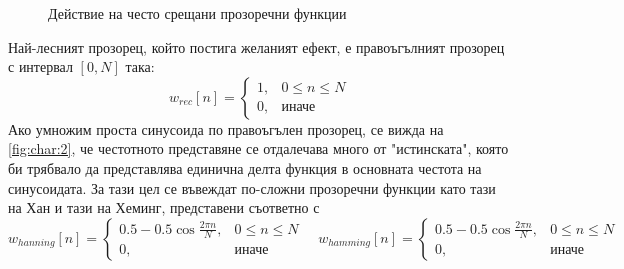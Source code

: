 \documentclass[main.tex]{subfiles}
\begin{document}
    \begin{figure}[H]%
        \centering
            \hspace{2cm}
            \vfill
            \hspace{2cm}
            \vfill
            \hspace{2cm}
        \caption{Действие на често срещани прозоречни функции}%
        \label{fig:char:2}
    \end{figure}

    Най-лесният прозорец, който постига желаният ефект, е правоъгълният прозорец с интервал $[0, N]$ така: 
   \[
    w_{rec}[n] = \begin{cases} 
        1, & 0\leq n \leq N \\
        0, & \text{иначе}
    \end{cases}
    \]
    Ако умножим проста синусоида по правоъгълен прозорец, се вижда на \autoref{fig:char:2}, че честотното представяне се отдалечава много от "истинската", която би трябвало да представлява единична делта функция в основната честота на синусоидата. За тази цел се въвеждат по-сложни прозоречни функции като тази на Хан и тази на Хеминг, представени съответно с
    \[
    w_{hanning}[n] = \begin{cases} 
        0.5 - 0.5 \cos{\frac{2\pi n}{N}}, & 0\leq n \leq N \\
        0, & \text{иначе}
    \end{cases}\quad w_{hamming}[n] = \begin{cases} 
        0.5 - 0.5 \cos{\frac{2\pi n}{N}}, & 0\leq n \leq N \\
        0, & \text{иначе}
    \end{cases}
    \]
\end{document}
